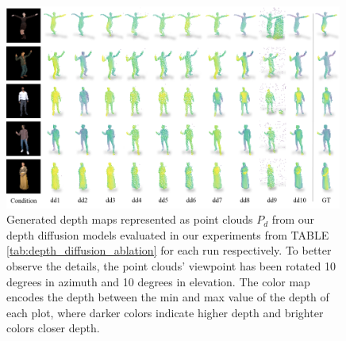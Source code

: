 \begin{figure}[t]
  \centering
  \includegraphics[width=0.99\textwidth]{illustrations/depth_ablation.png}
  \caption{Generated depth maps represented as point clouds $P_{d}$ from our depth diffusion models evaluated in our experiments from TABLE \ref{tab:depth_diffusion_ablation} for each run respectively. To better observe the details, the point clouds' viewpoint has been rotated 10 degrees in azimuth and 10 degrees in elevation. The color map encodes the depth between the min and max value of the depth of each plot, where darker colors indicate higher depth and brighter colors closer depth.}
  \label{fig:depth_ablation}
\end{figure}

